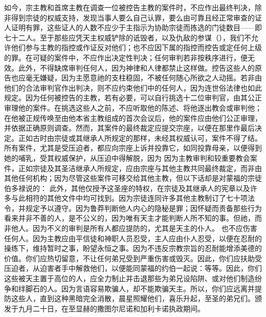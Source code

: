 如今，宗主教和首席主教在调查一位被控告主教的案件时，不应作出最终判决，除非得到宗徒的权威支持，发现当事人要么自己认罪，要么由可靠且经正常审查的证人证明有罪，这些证人的人数不应少于主指示为协助宗徒而拣选的门徒数目——即七十二人。至于那些应凭天主权威铲除的诋毁者，以及仇敌的参谋（），我们不允许他们参与主教的指控或作证反对他们；也不应因下属的指控而控告或定任何上级的罪。在可疑的案件中，不应作出决定性判决；任何审判若非按秩序进行，便无效。此外，不得缺席审判任何人，因为神律和人律都禁止这样做。控告这些人的原告也应毫无嫌疑，因为主愿意祂的支柱稳固，不被任何随心所欲之人动摇。若非由他们的合法审判官作出判决，则不应约束他们中的任何人，因为连世俗法律也如此规定。因为任何被控告的主教，若有必要，可以自行挑选十二位审判官，由其公正审理他的案件。在挑选这些人之前，不应听取他的陈述、将他逐出教会或审判他；在他被正规传唤至由他本省主教组成的首次会议后，他的案件应由他们公正审理，并依据正确原则调查。然而，其案件的最终裁定应提交宗座，以便在那里作最后决定。正如古时由宗徒或其继承人所规定的那样，未经其权威认可，案件不得了结。所有案件，尤其是受压迫者，都应向宗座上诉并投靠它，如同投靠母亲，以便得到她的哺乳，受其权威保护，从压迫中得解脱，因为 因为主教审判和较重要教会案件，正如宗徒及其圣洁继承人所规定，应由宗座与其他主教共同最终裁定，而非由其他任何机构；因为尽管这些案件可移交给其他主教，但以下话却是对蒙福的宗徒伯多禄说的： 此外，其他仅授予这圣座的特权，在宗徒及其继承人的宪章以及许多与此相符的其他文件中均可找到。因为宗徒连同许多其他主教制订了七十项法令，并规定予以遵守。因为鲁莽判断他人内心的隐秘是罪；因怀疑而责备那些行为看来并非不善的人，是不公义的，因为唯有天主才能判断人所不知的事。但祂，而非他人。因为不义的审判是所有人都应提防的，尤其是天主的仆人。 也不应伤害任何人。因为主教应由平信徒和神职人员忍受，主人应由仆人忍受，以便在忍耐的操练下，维持暂时之事，盼望永恒之事。因为不违反宗教宗旨的忍耐能增添美德的价值。你们应热切留意，不让任何弟兄受到严重伤害或毁灭。因此，你们应扶助受压迫者，从迫害者手中解救他们，以便能同蒙福的约伯一起说：等等。因此，你们这些被天主置于高位的人，应全力制止并击退那些为弟兄设陷阱、或对他们制造纷争和绊脚石的人。因为言语容易欺骗人，却不能欺骗天主。所以，你们应远离并提防这些人，直到这种黑暗完全消散，晨星照耀他们，喜乐升起，至圣的弟兄们。颁发于九月二十日，在至显赫的撒图尔尼诺和加利卡诺执政期间。\par

